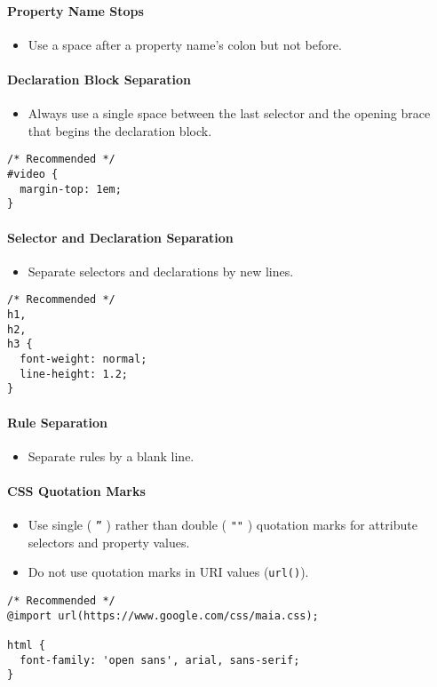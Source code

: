 \documentclass[a4paper, 11pt]{article}
\begin{document}
\paragraph{Property Name Stops}
\begin{itemize}
\item Use a space after a property name’s colon but not before.
\end{itemize}

\paragraph{Declaration Block Separation}
\begin{itemize}
\item Always use a single space between the last selector and the opening brace that begins the declaration block.
\end{itemize}
\begin{verbatim}
/* Recommended */
#video {
  margin-top: 1em;
}
\end{verbatim}

\paragraph{Selector and Declaration Separation}
\begin{itemize}
\item Separate selectors and declarations by new lines.
\end{itemize}
\begin{verbatim}
/* Recommended */
h1,
h2,
h3 {
  font-weight: normal;
  line-height: 1.2;
}
\end{verbatim}

\paragraph{Rule Separation}
\begin{itemize}
\item Separate rules by a blank line.
\end{itemize}

\paragraph{CSS Quotation Marks}
\begin{itemize}
\item Use single ( \texttt{''} ) rather than double ( \texttt{""} ) quotation marks for attribute selectors and property values.
\item Do not use quotation marks in URI values (\texttt{url()}).
\end{itemize}
\begin{verbatim}
/* Recommended */
@import url(https://www.google.com/css/maia.css);

html {
  font-family: 'open sans', arial, sans-serif;
}
\end{verbatim}
\end{document}
